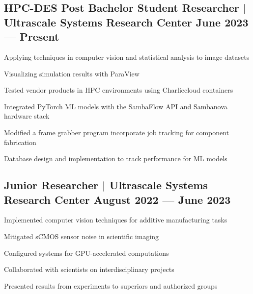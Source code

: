
\subsection{{HPC-DES Post Bachelor Student  Researcher | Ultrascale Systems Research Center \hfill June 2023 --- Present}}
\begin{zitemize}
\item Applying techniques in computer vision and statistical analysis to image datasets 
\item Visualizing simulation results with ParaView 
\item Tested vendor products in HPC environments using Charliecloud containers
\item Integrated PyTorch ML models with the SambaFlow API and Sambanova hardware stack 
\item Modified a frame grabber program incorporate job tracking for component fabrication
\item Database design and implementation to track performance for ML models
\end{zitemize}

\subsection{{Junior Researcher | Ultrascale Systems Research Center \hfill August 2022 --- June 2023}}
\begin{zitemize}
\item Implemented computer vision techniques for additive manufacturing tasks
\item Mitigated sCMOS sensor noise in scientific imaging
\item Configured systems for GPU-accelerated computations
\item Collaborated with scientists on interdisciplinary projects
\item Presented results from experiments to superiors and authorized groups
\end{zitemize}

